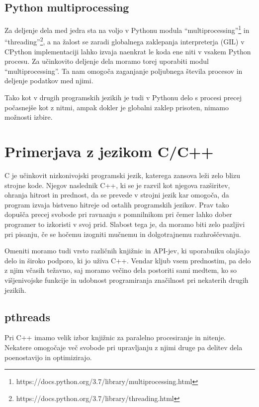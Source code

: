 \documentclass[journal,a4paper,twoside]{sty/IEEEtran}
\begin{document}
\subsection{Python multiprocessing}

Za deljenje dela med jedra sta na voljo v Pythonu modula “multiprocessing”\footnote{https://docs.python.org/3.7/library/multiprocessing.html} in
	“threading”\footnote{https://docs.python.org/3.7/library/threading.html}, a na žalost se zaradi globalnega zaklepanja interpreterja
	(GIL)\cite{python-gil} v CPython implementaciji lahko izvaja naenkrat le koda ene niti v vsakem Python procesu.
Za učinkovito deljenje dela moramo torej uporabiti modul “multiprocessing”.
Ta nam omogoča zaganjanje poljubnega števila procesov in deljenje podatkov med njimi.

Tako kot v drugih programskih jezikih je tudi v Pythonu delo s procesi precej počasnejše kot z nitmi, ampak dokler je globalni zaklep prisoten, nimamo
	možnosti izbire.

\section{Primerjava z jezikom C/C++}

C je učinkovit nizkonivojski programski jezik, katerega zansova leži zelo blizu strojne kode. 
Njegov naslednik C++, ki se je razvil kot njegova razširitev, ohranja hitrost in prednost, da se
prevede v strojni jezik kar omogoča, da program izvaja bistveno hitreje od ostalih programskih
jezikov. Prav tako dopušča precej svobode pri ravnanju s pomnilnikom pri čemer lahko dober 
programer to izkoristi v svoj prid. Slabost tega je, da moramo biti zelo pazljivi pri pisanju,
če se hočemu izogniti mučnemu in dolgotrajnemu razhroščevanju. 

Omeniti moramo tudi vrsto različnih knjižnic in API-jev, ki uporabniku olajšajo delo in široko podporo,
ki jo uživa C++. Vendar kljub vsem prednostim, pa delo z njim včasih težavno, saj moramo večino
dela postoriti sami medtem, ko so višjenivojske funkcije in udobnost programiranja značilnost 
pri nekaterih drugih jezikih. 

\subsection{pthreads}

Pri C++ imamo velik izbor knjižnic za paralelno procesiranje in nitenje. Nekatere omogočaje več
svobode pri upravljanju z njimi druge pa delitev dela poenostavijo in optimizirajo. 
\end{document}
